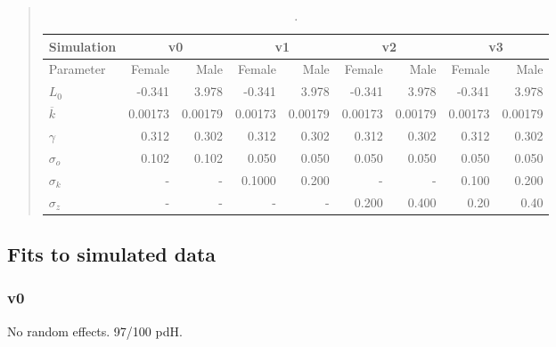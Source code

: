 \documentclass[11pt, a4paper]{article}
\begin{document}
\begin{table}[!htbp]
  \begin{quote}
    \caption{\label{tab:sims} .} \small{
      \begin{center}
        \begin{tabular}{|l||rr|rr|rr|rr|}
          \hline
          Simulation     & \multicolumn{2}{c|}{v0} & \multicolumn{2}{c|}{v1} &
          \multicolumn{2}{c|}{v2} & \multicolumn{2}{c|}{v3}\\
          \hline
          Parameter      & Female  & Male    & Female & Male & Female & Male & Female & Male\\
          \hline \hline
          $L_0$          & -0.341  & 3.978   & -0.341  & 3.978   & -0.341  & 3.978 & -0.341 & 3.978\\
          $\overline{k}$ & 0.00173 & 0.00179 & 0.00173 & 0.00179 & 0.00173 & 0.00179 & 0.00173 & 0.00179\\
          $\gamma$       & 0.312   & 0.302   & 0.312   & 0.302   & 0.312   & 0.302 & 0.312 & 0.302\\
          \hline
          $\sigma_o$     & 0.102   & 0.102   & 0.050    & 0.050  & 0.050   & 0.050 & 0.050 & 0.050\\
          $\sigma_k$     & -       & -       & 0.1000   & 0.200  & -       & - & 0.100 & 0.200\\
          $\sigma_z$     & -       & -       & -        & -      & 0.200   & 0.400 & 0.20 & 0.40\\
          \hline
        \end{tabular}
      \end{center}
    }
  \end{quote}
\end{table}



\newpage\clearpage
\subsection{Fits to simulated data}

\subsubsection{v0}
No random effects. 97/100 pdH.
\end{document}

